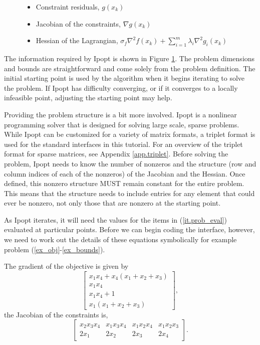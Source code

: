 \documentclass[letter,10pt]{article}
\begin{document}
{\begin{figure}
\begin{enumerate}
\begin{itemize}
                        \item Constraint residuals, $g(x_k)$
                        \item Jacobian of the constraints, $\nabla g(x_k)$
                        \item Hessian of the Lagrangian, 
                        $\sigma_f \nabla^2 f(x_k) + \sum_{i=1}^m\lambda_i\nabla^2 g_i(x_k)$ 
                \end{itemize}
\end{enumerate}
\label{fig.required_info}
\end{figure}
\vspace{0.1in}
The information required by Ipopt is shown in Figure
\ref{fig.required_info}. The problem dimensions and bounds are
straightforward and come solely from the problem definition. The
initial starting point is used by the algorithm when it begins
iterating to solve the problem. If Ipopt has difficulty converging, or
if it converges to a locally infeasible point, adjusting the starting
point may help.

Providing the problem structure is a bit more involved. Ipopt is a
nonlinear programming solver that is designed for solving large scale,
sparse problems. While Ipopt can be customized for a variety of matrix
formats, a triplet format is used for the standard interfaces in this
tutorial. For an overview of the triplet format for sparse matrices,
see Appendix \ref{app.triplet}. Before solving the problem, Ipopt
needs to know the number of nonzeros and the structure (row and column
indices of each of the nonzeros) of the Jacobian and the Hessian. Once
defined, this nonzero structure MUST remain constant for the entire
problem. This means that the structure needs to include entries for
any element that could ever be nonzero, not only those that are
nonzero at the starting point.

As Ipopt iterates, it will need the values for the items in
(\ref{it.prob_eval}) evaluated at particular points. Before we can
begin coding the interface, however, we need to work out the details
of these equations symbolically for example problem
(\ref{ex_obj}-\ref{ex_bounds}).

The gradient of the objective is given by
\begin{equation}
\left[
\begin{array}{c}
x_1 x_4 + x_4 (x_1 + x_2 + x_3) \\
x_1 x_4 \\
x_1 x_4 + 1 \\
x_1 (x_1 + x_2 + x_3)
\end{array}
\right],
\end{equation}
the Jacobian of 
the constraints is,
\begin{equation}
\left[
\begin{array}{cccc}
x_2 x_3 x_4     & x_1 x_3 x_4   & x_1 x_2 x_4   & x_1 x_2 x_3   \\
2 x_1           & 2 x_2         & 2 x_3         & 2 x_4
\end{array}
\right].
\end{equation}

}
\end{document}
